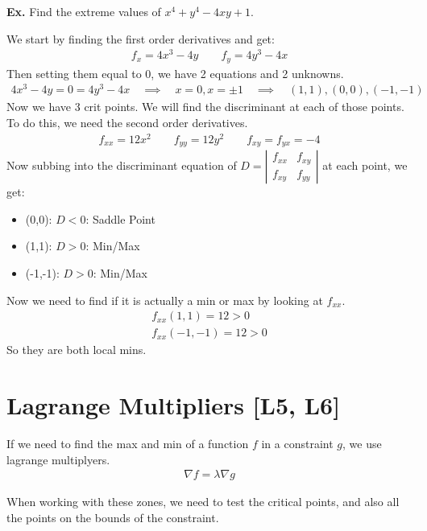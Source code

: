 \documentclass[12pt,letterpaper]{article} \usepackage{amsmath} \usepackage{graphicx} \usepackage[margin=1in]{geometry} \usepackage{longtable}  \usepackage{amssymb}
\begin{document}
	\begin{mdframed}[]
		\textbf{Ex.} Find the extreme values of $x^4 + y^4 - 4xy + 1$.
		
		We start by finding the first order derivatives and get:
		\begin{align*}
			f_x = 4x^3 - 4y \qquad f_y = 4y^3 - 4x
		\end{align*}
		Then setting them equal to 0, we have 2 equations and 2 unknowns.
		\begin{align*}
			4x^3 - 4y = 0 = 4y^3 - 4x \quad \implies \quad x=0, x=\pm 1 \quad \implies \quad (1,1), (0,0), (-1,-1)
		\end{align*}
		Now we have 3 crit points. We will find the discriminant at each of those points. To do this, we need the second order derivatives.
		\begin{align*}
			f_{xx} = 12x^2 \qquad f_{yy} = 12y^2 \qquad f_{xy} = f_{yx} = -4
		\end{align*}
		Now subbing into the discriminant equation of $D = \left| 
		\begin{array}{cc}
			f_{xx} & f_{xy} \\
			f_{xy} & f_{yy}
		\end{array} \right|$ at each point, we get:
		\begin{itemize}[noitemsep]
			\item (0,0): $D<0$: Saddle Point
			\item (1,1): $D>0$: Min/Max
			\item (-1,-1): $D>0$: Min/Max
		\end{itemize}
		Now we need to find if it is actually a min or max by looking at $f_{xx}$.
		\begin{align*}
			f_{xx}(1,1) = 12 > 0\\
			f_{xx}(-1,-1) = 12>0
		\end{align*}
		So they are both local mins.
	\end{mdframed}
	
	\section{Lagrange Multipliers [L5, L6]}
	If we need to find the max and min of a function $f$ in a constraint $g$, we use lagrange multiplyers. 
	\begin{align*}
		\nabla f = \lambda \nabla g
	\end{align*}

	When working with these zones, we need to test the critical points, and also all the points on the bounds of the constraint. 
	
\end{document}
